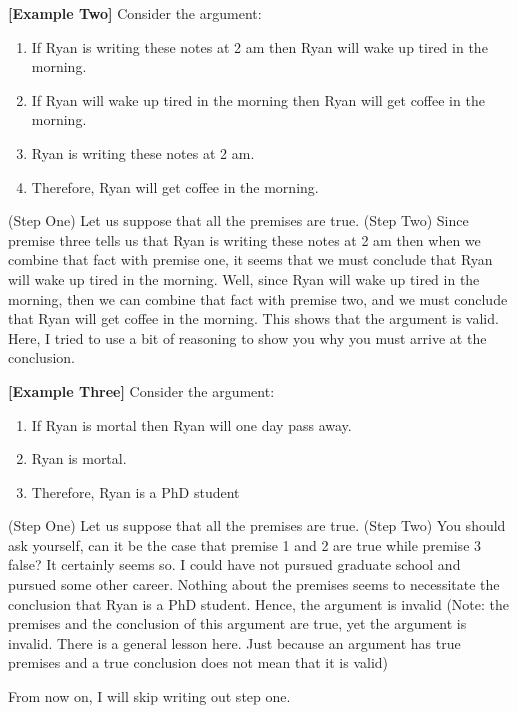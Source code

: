 \documentclass[
]{book}
\providecommand{\tightlist}{%
  \setlength{\itemsep}{0pt}\setlength{\parskip}{0pt}}
\begin{document}
\textbf{{[}Example Two{]}} Consider the argument:

\begin{enumerate}
\def\labelenumi{\arabic{enumi}.}
\tightlist
\item
  If Ryan is writing these notes at 2 am then Ryan will wake up tired in the morning.
\item
  If Ryan will wake up tired in the morning then Ryan will get coffee in the morning.
\item
  Ryan is writing these notes at 2 am.
\item
  Therefore, Ryan will get coffee in the morning.
\end{enumerate}

(Step One) Let us suppose that all the premises are true. (Step Two) Since premise three tells us that Ryan is writing these notes at 2 am then when we combine that fact with premise one, it seems that we must conclude that Ryan will wake up tired in the morning. Well, since Ryan will wake up tired in the morning, then we can combine that fact with premise two, and we must conclude that Ryan will get coffee in the morning. This shows that the argument is valid. Here, I tried to use a bit of reasoning to show you why you must arrive at the conclusion.

\textbf{{[}Example Three{]}} Consider the argument:

\begin{enumerate}
\def\labelenumi{\arabic{enumi}.}
\tightlist
\item
  If Ryan is mortal then Ryan will one day pass away.
\item
  Ryan is mortal.
\item
  Therefore, Ryan is a PhD student
\end{enumerate}

(Step One) Let us suppose that all the premises are true. (Step Two) You should ask yourself, can it be the case that premise 1 and 2 are true while premise 3 false? It certainly seems so. I could have not pursued graduate school and pursued some other career. Nothing about the premises seems to necessitate the conclusion that Ryan is a PhD student. Hence, the argument is invalid (Note: the premises and the conclusion of this argument are true, yet the argument is invalid. There is a general lesson here. Just because an argument has true premises and a true conclusion does not mean that it is valid)

From now on, I will skip writing out step one.
\end{document}
